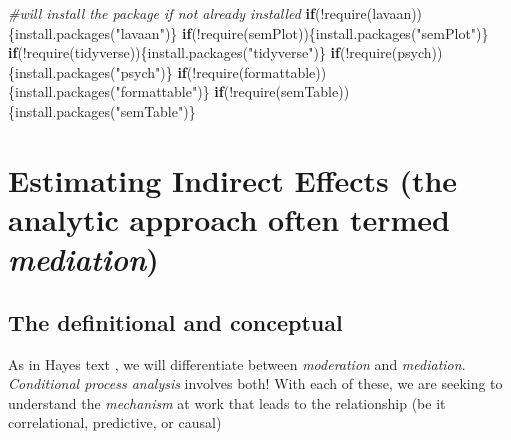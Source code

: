 \documentclass[
]{book}
\newenvironment{Shaded}{\begin{snugshade}}{\end{snugshade}}
\newcommand{\CommentTok}[1]{\textcolor[rgb]{0.56,0.35,0.01}{\textit{#1}}}
\newcommand{\ControlFlowTok}[1]{\textcolor[rgb]{0.13,0.29,0.53}{\textbf{#1}}}
\newcommand{\FunctionTok}[1]{\textcolor[rgb]{0.00,0.00,0.00}{#1}}
\newcommand{\NormalTok}[1]{#1}
\newcommand{\SpecialCharTok}[1]{\textcolor[rgb]{0.00,0.00,0.00}{#1}}
\newcommand{\StringTok}[1]{\textcolor[rgb]{0.31,0.60,0.02}{#1}}
\begin{document}
\begin{Shaded}
\begin{Highlighting}[]
\CommentTok{\#will install the package if not already installed}
\ControlFlowTok{if}\NormalTok{(}\SpecialCharTok{!}\FunctionTok{require}\NormalTok{(lavaan))\{}\FunctionTok{install.packages}\NormalTok{(}\StringTok{"lavaan"}\NormalTok{)\}}
\ControlFlowTok{if}\NormalTok{(}\SpecialCharTok{!}\FunctionTok{require}\NormalTok{(semPlot))\{}\FunctionTok{install.packages}\NormalTok{(}\StringTok{"semPlot"}\NormalTok{)\}}
\ControlFlowTok{if}\NormalTok{(}\SpecialCharTok{!}\FunctionTok{require}\NormalTok{(tidyverse))\{}\FunctionTok{install.packages}\NormalTok{(}\StringTok{"tidyverse"}\NormalTok{)\}}
\ControlFlowTok{if}\NormalTok{(}\SpecialCharTok{!}\FunctionTok{require}\NormalTok{(psych))\{}\FunctionTok{install.packages}\NormalTok{(}\StringTok{"psych"}\NormalTok{)\}}
\ControlFlowTok{if}\NormalTok{(}\SpecialCharTok{!}\FunctionTok{require}\NormalTok{(formattable))\{}\FunctionTok{install.packages}\NormalTok{(}\StringTok{"formattable"}\NormalTok{)\}}
\ControlFlowTok{if}\NormalTok{(}\SpecialCharTok{!}\FunctionTok{require}\NormalTok{(semTable))\{}\FunctionTok{install.packages}\NormalTok{(}\StringTok{"semTable"}\NormalTok{)\}}
\end{Highlighting}
\end{Shaded}

\hypertarget{estimating-indirect-effects-the-analytic-approach-often-termed-mediation}{%
\section{\texorpdfstring{Estimating Indirect Effects (the analytic approach often termed \emph{mediation})}{Estimating Indirect Effects (the analytic approach often termed mediation)}}\label{estimating-indirect-effects-the-analytic-approach-often-termed-mediation}}

\hypertarget{the-definitional-and-conceptual}{%
\subsection{The definitional and conceptual}\label{the-definitional-and-conceptual}}

As in Hayes text \citeyearpar{hayes_introduction_2018}, we will differentiate between \emph{moderation} and \emph{mediation}. \emph{Conditional process analysis} involves both! With each of these, we are seeking to understand the \emph{mechanism} at work that leads to the relationship (be it correlational, predictive, or causal)
\end{document}
